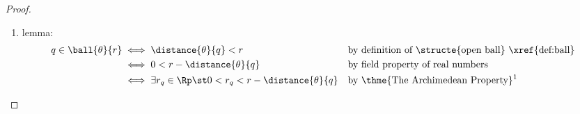 \begin{proof}
\begin{enumerate}
  \item lemma: \label{ilem:openball_openset_lem}
    \begin{align*}
      q\in\ball{\theta}{r}
        &\iff \distance{\theta}{q} < r
       && \text{by definition of \structe{open ball} \xref{def:ball}}
      \\&\iff 0< r-\distance{\theta}{q}
        && \text{by field property of real numbers}
      \\&\iff \exists r_q\in\Rp \st 0< r_q< r-\distance{\theta}{q}
        &&\text{by \thme{The Archimedean Property}\footnotemark}
    \end{align*}


\end{enumerate}
\end{proof}
